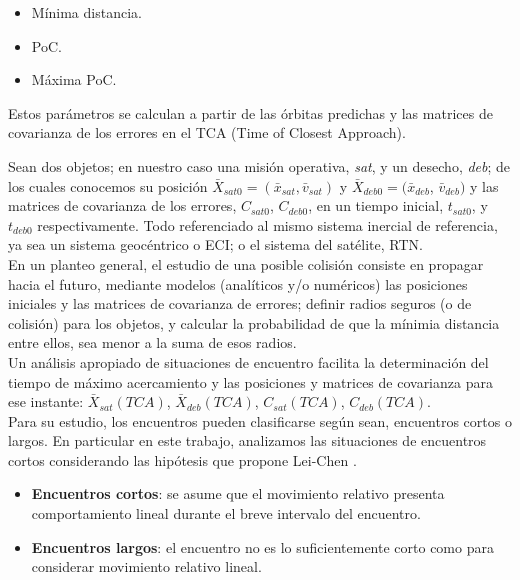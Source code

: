 \begin{itemize}
\itemsep0em
\item M\'inima distancia.
\item PoC.
\item M\'axima PoC.
\end{itemize}


Estos par\'ametros se calculan a partir de las \'orbitas predichas y las matrices de covarianza de los errores en el TCA (Time of Closest Approach).

Sean dos objetos; en nuestro caso una misi\'on operativa, {\it{sat}}, y un desecho, {\it{deb}}; de los cuales conocemos su posici\'on $\bar{X}_{sat0}=(\bar{x}_{sat},\bar{v}_{sat})$ y $\bar{X}_{deb0}=(\bar{x}_{deb}$,  $\bar{v}_{deb})$ y las matrices de covarianza de los errores, $C_{sat0}$, $C_{deb0}$, en un tiempo inicial,  $t_{sat0}$, y $t_{deb0}$ respectivamente. Todo referenciado al mismo sistema inercial de referencia, ya sea un sistema geoc\'entrico o \ac{ECI}; o el sistema del sat\'elite, \ac{RTN}.\\

En un planteo general, el estudio de una posible colisi\'on consiste en propagar hacia el futuro, mediante modelos (anal\'iticos y/o num\'ericos) las posiciones iniciales y las matrices de covarianza de errores; definir radios seguros (o de colisi\'on) para los objetos, y calcular la probabilidad de que la m\'inimia distancia entre ellos, sea menor a la suma de esos radios.\\

Un an\'alisis apropiado de situaciones de encuentro facilita la determinaci\'on del tiempo de m\'aximo acercamiento y las posiciones y matrices de covarianza para ese instante:  $\bar{X}_{sat}(TCA)$, $\bar{X}_{deb}(TCA)$, $C_{sat}(TCA)$, $C_{deb}(TCA)$.\\

Para su estudio, los encuentros pueden clasificarse seg\'un sean, encuentros cortos o largos. En particular en este trabajo, analizamos las situaciones de encuentros cortos considerando las hip\'otesis que propone Lei-Chen \citep{leichen}.\\

\begin{itemize}
 \item {\bf{Encuentros cortos}}: se asume que el movimiento relativo presenta comportamiento lineal durante el breve intervalo del encuentro.
 \item {\bf{Encuentros largos}}: el encuentro no es lo suficientemente corto como para considerar movimiento relativo lineal.
\end{itemize}


